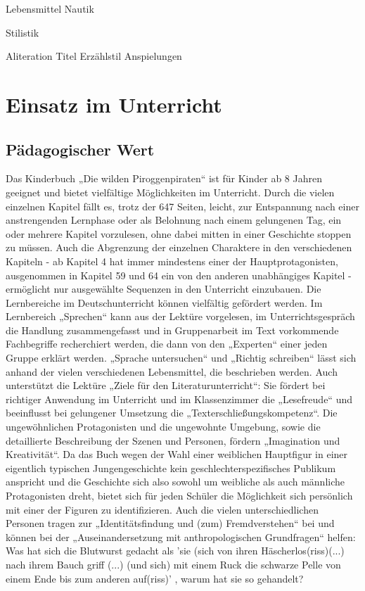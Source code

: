 {Lebensmittel
Nautik

Stilistik

Aliteration Titel
Erzählstil
Anspielungen
					
					


\section{Einsatz im Unterricht}

\subsection{Pädagogischer Wert}
Das Kinderbuch „Die wilden Piroggenpiraten“ ist für Kinder ab 8 Jahren geeignet und bietet vielfältige Möglichkeiten im Unterricht. Durch die vielen einzelnen Kapitel fällt es, trotz der 647 Seiten, leicht, zur Entspannung nach einer anstrengenden Lernphase oder als Belohnung nach einem gelungenen Tag, ein oder mehrere Kapitel vorzulesen, ohne dabei mitten in einer Geschichte stoppen zu müssen. Auch die Abgrenzung der einzelnen Charaktere in den verschiedenen Kapiteln - ab Kapitel 4 hat immer mindestens einer der Hauptprotagonisten, ausgenommen in Kapitel 59 und 64 ein von den anderen unabhängiges Kapitel - ermöglicht nur ausgewählte Sequenzen in den Unterricht einzubauen. Die Lernbereiche im Deutschunterricht können vielfältig gefördert werden. Im Lernbereich „Sprechen“  kann aus der Lektüre vorgelesen, im Unterrichtsgespräch die Handlung zusammengefasst und in Gruppenarbeit im Text vorkommende Fachbegriffe recherchiert werden, die dann von den „Experten“ einer jeden Gruppe erklärt werden. „Sprache untersuchen“ und „Richtig schreiben“ lässt sich anhand der vielen verschiedenen Lebensmittel, die beschrieben werden. Auch unterstützt die Lektüre „Ziele für den Literaturunterricht“: Sie fördert bei richtiger Anwendung im Unterricht und im Klassenzimmer die „Lesefreude“ und beeinflusst bei gelungener Umsetzung die „Texterschließungskompetenz“. Die ungewöhnlichen Protagonisten und die ungewohnte Umgebung, sowie die detaillierte Beschreibung der Szenen und Personen, fördern „Imagination und Kreativität“. Da das Buch wegen der Wahl einer weiblichen Hauptfigur in einer eigentlich typischen Jungengeschichte kein geschlechterspezifisches Publikum anspricht und die Geschichte sich also sowohl um weibliche als auch männliche Protagonisten dreht, bietet sich für jeden Schüler die Möglichkeit sich persönlich mit einer der Figuren zu identifizieren. Auch die vielen unterschiedlichen Personen tragen zur „Identitätsfindung und (zum) Fremdverstehen“ bei und können bei der „Auseinandersetzung mit anthropologischen Grundfragen“ helfen: Was hat sich die Blutwurst gedacht  als 'sie (sich von ihren Häscherlos(riss)(...) nach ihrem Bauch griff (...) (und sich) mit einem Ruck die schwarze Pelle von einem Ende bis zum anderen auf(riss)' \cite[S.229]{pir},  warum hat sie so gehandelt?



}
